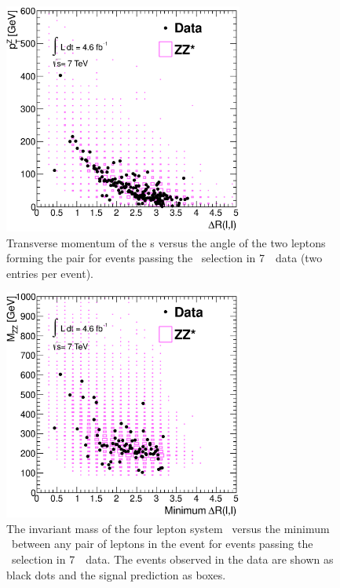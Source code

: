  \begin{figure}[htbp]
 \begin{center}
  \includegraphics[width=0.7\textwidth]{7TeV/h_dr_ptz}\hfill
  \caption[Transverse momentum of the \leppair s versus the angle of the two leptons
    forming the pair for events passing the \ZZs\ selection in 7~\tev\ data.]
    {\small Transverse momentum of the \leppair s versus the angle of the two leptons
    forming the pair for events passing the \ZZs\ selection in 7~\tev\ data (two
    entries per event).}
 \label{fig:zzdists-dr-ptz1-seven}
 \end{center}
 \end{figure}

 \begin{figure}[htbp]
 \begin{center}
  \includegraphics[width=0.7\textwidth]{7TeV/h_mindr_mzz}\hfill
  \caption[The invariant mass of the four lepton system \mZZ\ versus the
    minimum \deltaR\ between any pair of leptons in the event for events passing
    the \ZZs\ selection in 7~\tev\ data.]
    {\small The invariant mass of the four lepton system \mZZ\ versus the
    minimum \deltaR\ between any pair of leptons in the event for events passing
    the \ZZs\ selection in 7~\tev\ data.
    The events observed in the data are shown as black dots and the signal prediction as boxes.}
 \label{fig:zzdists-mindr-mzz-seven}
 \end{center}
 \end{figure}

